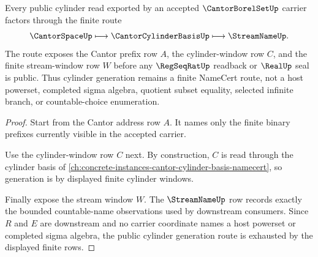 \begin{theorem}
\label{thm:cantor-borel-set-cylinder-generation}
Every public cylinder read exported by an accepted $\CantorBorelSetUp$ carrier factors through the finite route
$$
\CantorSpaceUp \longmapsto \CantorCylinderBasisUp \longmapsto \StreamNameUp .
$$
The route exposes the Cantor prefix row $A$, the cylinder-window row $C$, and the finite stream-window row $W$ before any $\RegSeqRatUp$ readback or $\RealUp$ seal is public. Thus cylinder generation remains a finite NameCert route, not a host powerset, completed sigma algebra, quotient subset equality, selected infinite branch, or countable-choice enumeration.
\end{theorem}
\begin{proof}
Start from the Cantor address row $A$. It names only the finite binary prefixes currently visible in the accepted carrier.

Use the cylinder-window row $C$ next. By construction, $C$ is read through the cylinder basis of \autoref{ch:concrete-instances-cantor-cylinder-basis-namecert}, so generation is by displayed finite cylinder windows.

Finally expose the stream window $W$. The $\StreamNameUp$ row records exactly the bounded countable-name observations used by downstream consumers. Since $R$ and $E$ are downstream and no carrier coordinate names a host powerset or completed sigma algebra, the public cylinder generation route is exhausted by the displayed finite rows.
\end{proof}

